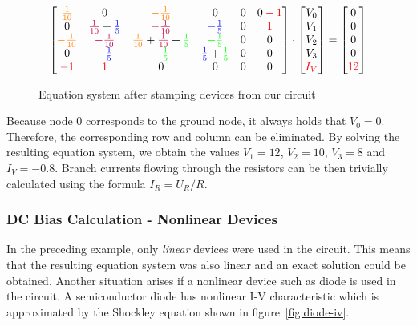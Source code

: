 \begin{figure}[h]
	\centering
	\[
	\color{black}
	\begin{bmatrix}
	\mathcolor{orange}{\frac{1}{10}}	&0	&	\mathcolor{orange}{-\frac{1}{10}}  	&0 	&0	& 0 \mathcolor{red}{-1}\\
	0	&	\mathcolor{purple}{\frac{1}{10}} + \mathcolor{blue}{\frac{1}{5}}	&	\mathcolor{purple}{-\frac{1}{10}}  	& \mathcolor{blue}{-\frac{1}{5}}	&0	&  \mathcolor{red}{1}\\
	\mathcolor{orange}{-\frac{1}{10}}	&	\mathcolor{purple}{-\frac{1}{10}}	&	\mathcolor{orange}{\frac{1}{10}} + \mathcolor{purple}{\frac{1}{10}} + \mathcolor{green}{\frac{1}{5}} 	&  \mathcolor{green}{-\frac{1}{5}} 	&0 & 0  \\
	0	&\mathcolor{blue}{-\frac{1}{5}}	& \mathcolor{green}{-\frac{1}{5}} 	& \mathcolor{blue}{\frac{1}{5}} + \mathcolor{green}{\frac{1}{5}} &0	&0 \\
	\mathcolor{red}{-1}	& \mathcolor{red}{1}	&0  	&0 	&0	&0
	\end{bmatrix} \cdot 
	\begin{bmatrix}
	V_0\\
	V_1\\
	V_2\\
	V_3\\
	\mathcolor{red}{I_V}
	\end{bmatrix}
	=
	\begin{bmatrix}
	0\\
	0\\
	0\\
	0\\
	\mathcolor{red}{12}
	\end{bmatrix}
	\]
	\caption{Equation system after stamping devices from our circuit}
	\label{fig:equation-example}
\end{figure}

Because node 0 corresponds to the ground node, it always holds that $V_0 = 0$. Therefore, the corresponding row and column can be eliminated. By solving the resulting equation system, we obtain the values $V_1 = 12$, $V_2=10$, $V_3=8$ and $I_V=-0.8$. Branch currents flowing through the resistors can be then trivially calculated using the formula $I_R = U_R/R$. 

\subsubsection{DC Bias Calculation - Nonlinear Devices}
In the preceding example, only \textit{linear} devices were used in the circuit. This means that the resulting equation system was also linear and an exact solution could be obtained. Another situation arises if a nonlinear device such as diode is used in the circuit. A semiconductor diode has nonlinear I-V characteristic which is approximated by the Shockley equation shown in figure~\ref{fig:diode-iv}.

